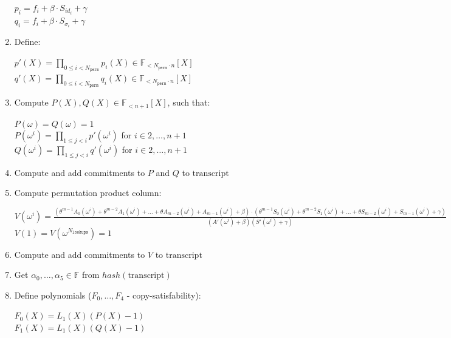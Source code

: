 \begin{enumerate}
\begin{center}
            $p_i = f_i + \beta \cdot S_{id_i} + \gamma$ \\
            $q_i = f_i + \beta \cdot S_{\sigma_i} + \gamma$
        \end{center}
    \item Define:
        \begin{center}
            $p'(X) = \prod\limits_{0 \leq i < N_{\texttt{perm}}} p_i(X) \in \mathbb{F}_{<N_{\texttt{perm}} \cdot n}[X]$ \\
            $q'(X) = \prod\limits_{0 \leq i < N_{\texttt{perm}}} q_i(X) \in \mathbb{F}_{<N_{\texttt{perm}} \cdot n}[X]$
        \end{center}
    \item Compute $P(X), Q(X) \in \mathbb{F}_{<n+1}[X]$, such that:
        \begin{center}
            $P(\omega) = Q(\omega) = 1$ \\
            $P(\omega^i) = \prod\limits_{1 \leq j < i}p'(\omega^i)$ for $i \in {2, \dots, n + 1}$ \\
            $Q(\omega^i) = \prod\limits_{1 \leq j < i}q'(\omega^i)$ for $i \in {2, \dots, n + 1}$ \\
        \end{center}
    \item Compute and add commitments to $P$ and $Q$ to $\text{transcript}$
    \item Compute permutation product column:
        \begin{center}
            $V (\omega^i) = \frac{(\theta^{m-1} A_0(\omega^i) + \theta^{m-2} A_1(\omega^i) + ... + \theta A_{m-2}(\omega^i) + A_{m-1}(\omega^i) + \beta) \cdot (\theta^{m-1} S_0(\omega^i) + \theta^{m-2} S_1(\omega^i) + ... + \theta S_{m-2}(\omega^i) + S_{m-1}(\omega^i) + \gamma)} {(A'(\omega^i) + \beta) (S'(\omega^i) + \gamma)}$ \\
            $V (1) = V (\omega^{N_{\texttt{lookups}}}) = 1$
        \end{center}
    \item Compute and add commitments to $V$ to $\text{transcript}$
    \item Get $\alpha_0, \dots, \alpha_5 \in \mathbb{F}$ from $hash(\text{transcript})$
    \item Define polynomials ($F_0, \dots, F_4$ - copy-satisfability):
        \begin{center}
            $F_0(X) = L_1(X)(P(X) - 1)$\\
            $F_1(X) = L_1(X)(Q(X) - 1)$ \\

\end{center}
\end{enumerate}
